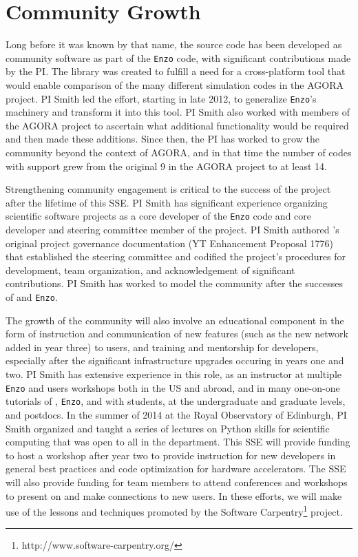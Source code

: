 \section{Community Growth}\label{sec:community_growth}


Long before it was known by that name, the \grackle{} source code has
been developed as community software as part of the \texttt{Enzo}
code, with significant contributions made by the PI.  The \grackle{}
library was created to fulfill a need
for a cross-platform tool that would enable comparison of the many
different simulation codes in the AGORA project.  PI Smith led the
effort, starting in late 2012, to generalize \texttt{Enzo}'s machinery
and transform it into this tool.  PI Smith also worked with members of
the AGORA project to ascertain what additional functionality would be
required and then made these additions.  Since then, the PI has worked
to grow the \grackle{} community beyond the context of AGORA, and in
that time the number of codes with \grackle{} support grew from the
original 9 in the AGORA project to at least 14.

Strengthening community engagement is critical to the success of the
\grackle{} project after the lifetime of this SSE.  PI Smith has
significant experience organizing scientific software projects as a
core developer of the \texttt{Enzo} code and core developer and
steering committee member of the \yt{} project.  PI Smith authored
\yt{}'s original project governance documentation (YT Enhancement
Proposal 1776) that established the steering committee and codified the
project's procedures for development, team organization, and
acknowledgement of significant contributions.  PI Smith has worked to
model the \grackle{} community after the successes of \yt{} and
\texttt{Enzo}.

The growth of the \grackle{} community will also involve an
educational component in the form of instruction and communication of
new features (such as the new network added in year three) to users,
and training and mentorship for developers, especially after the
significant infrastructure upgrades occuring in years one and two.  PI
Smith has extensive experience in this role, as an instructor at
multiple \texttt{Enzo} and \yt{} users workshops both in the US and
abroad, and in many one-on-one tutorials of \grackle{}, \texttt{Enzo},
and \yt{} with students, at the undergraduate and graduate levels, and
postdocs.  In the summer of 2014 at the Royal Observatory of
Edinburgh, PI Smith organized and taught a series of lectures on
Python skills for scientific computing that was open to all in the
department.  This SSE will provide funding to host a
workshop after year two to provide instruction for new developers in
general best practices and code optimization for hardware
accelerators.  The SSE will also provide funding for team members to
attend conferences and workshops to present on \grackle{} and make
connections to new users.  In these efforts, we will make use of the
lessons and techniques promoted by the Software
Carpentry\footnote{http://www.software-carpentry.org/} project.

